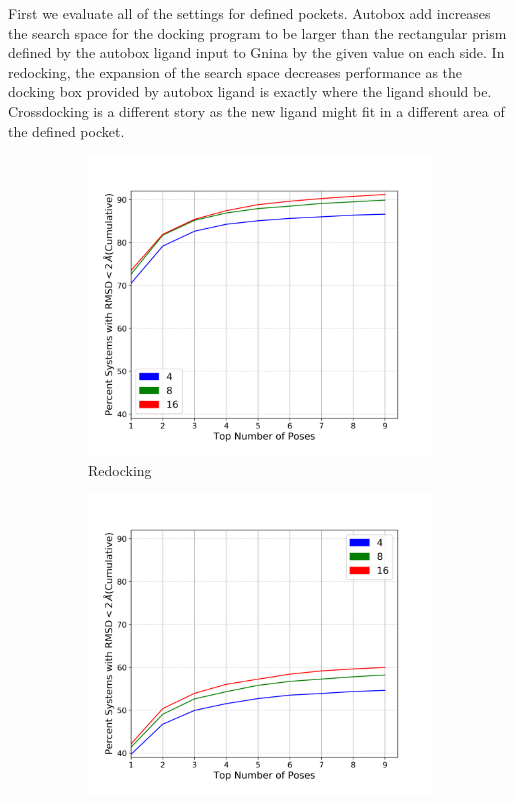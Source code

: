 \documentclass[journal=jcisd8,manuscript=article]{achemso}
\begin{document}
First we evaluate all of the settings for defined pockets. Autobox add increases the search space for the docking program to be larger than the rectangular prism defined by the autobox ligand input to Gnina by the given value on each side. In redocking, the expansion of the search space decreases performance as the docking box provided by autobox ligand is exactly where the ligand should be. Crossdocking is a different story as the new ligand might fit in a different area of the defined pocket.

\begin{figure}    
        \begin{subfigure}[b]{0.48\textwidth}    
		\centering
		\includegraphics[width=\textwidth]{figures/redocking/sweep_exhaustiveness_line.png}
		\caption{Redocking}
		\label{fig:exhaustiveness rd}
        \end{subfigure}    
        \begin{subfigure}[b]{0.48\textwidth}    
		\centering
		\includegraphics[width=\textwidth]{figures/crossdocking/sweep_exhaustiveness_line.png}

\end{subfigure}
\end{figure}
\end{document}
